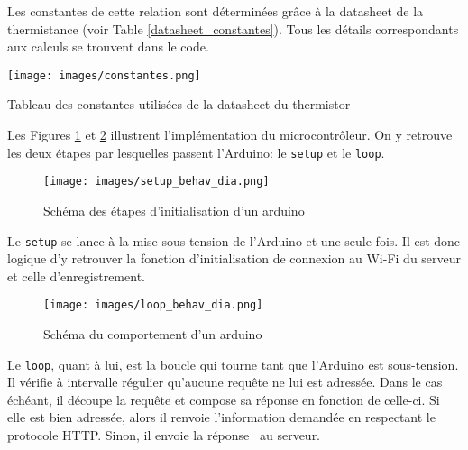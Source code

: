 \documentclass[11pt,a4paper,11pt]{report}
\begin{document}
Les constantes de cette relation sont déterminées grâce à la datasheet de la thermistance (voir Table \ref{datasheet_constantes}\cite{datash}). Tous les détails correspondants aux calculs se trouvent dans le code.


\begin{table}[h]
 \begin{center}
  \texttt{[image: images/constantes.png]}
  \caption{Tableau des constantes utilisées de la datasheet du thermistor}
  \label{datasheet_constantes}
 \end{center}
\end{table}

Les Figures \ref{setup_behav_dia} et \ref{loop_behav_dia} illustrent l'implémentation du microcontrôleur. On y retrouve les deux étapes par lesquelles passent l'Arduino: le \texttt{setup} et le \texttt{loop}.\\ 


\begin{figure}[h]
 \begin{center}
  \texttt{[image: images/setup\_behav\_dia.png]}
  \caption{Schéma des étapes d'initialisation d'un arduino}
  \label{setup_behav_dia}
 \end{center}
\end{figure}

Le \texttt{setup} se lance à la mise sous tension de l'Arduino et une seule fois. Il est donc logique d'y retrouver la fonction d'initialisation de connexion au Wi-Fi du serveur et celle d'enregistrement.\\

\begin{figure}[h]
 \begin{center}
  \texttt{[image: images/loop\_behav\_dia.png]}
  \caption{Schéma du comportement d'un arduino}
  \label{loop_behav_dia}
 \end{center}
\end{figure}

Le \texttt{loop}, quant à lui, est la boucle qui tourne tant que l'Arduino est sous-tension. Il vérifie à intervalle régulier qu'aucune requête ne lui est adressée. Dans le cas échéant, il découpe la requête et compose sa réponse en fonction de celle-ci. Si elle est bien adressée, alors il renvoie l'information demandée en respectant le protocole HTTP. Sinon, il envoie la réponse  \fg ~au serveur.\\ 
\end{document}
